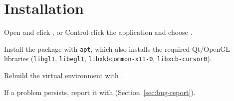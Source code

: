 \section{Installation}

Open  and click , or Control-click
the application and choose .

Install the package with \texttt{apt}, which also installs the required Qt/OpenGL libraries
(\texttt{libgl1}, \texttt{libegl1}, \texttt{libxkbcommon-x11-0}, \texttt{libxcb-cursor0}).

Rebuild the virtual environment with .

\medskip
If a problem persists, report it with 
(Section~\ref{sec:bug-report}).

